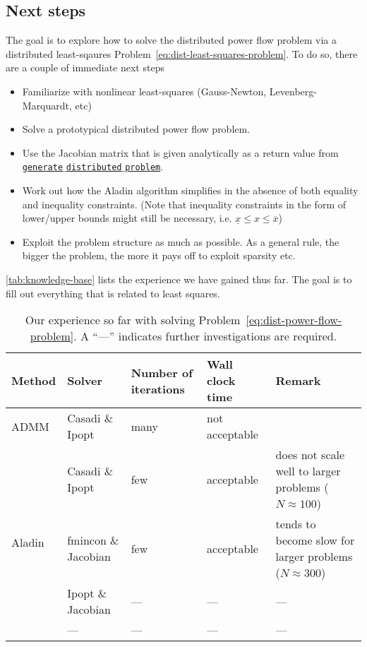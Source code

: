 \documentclass{article}
\begin{document}
\subsection{Next steps}

The goal is to explore how to solve the distributed power flow problem via a distributed least-sqaures Problem~\ref{eq:dist-least-squares-problem}.
To do so, there are a couple of immediate next steps
\begin{itemize}
    \item Familiarize with nonlinear least-squares (Gauss-Newton, Levenberg-Marquardt, etc)
    \item Solve a prototypical distributed power flow problem.
    \item Use the Jacobian matrix that is given analytically as a return value from \href{https://iai-vcs.iai.kit.edu/advancedcontrol/code/morenet/morenet/-/blob/master/03_parser/generate_distributed_problem.m}{\texttt{generate$\_$distributed$\_$problem}}.
    \item Work out how the Aladin algorithm simplifies in the absence of both equality and inequality constraints. (Note that inequality constraints in the form of lower/upper bounds might still be necessary, i.e. $\underline{x} \leq x \leq \overline{x}$)
    \item Exploit the problem structure as much as possible. As a general rule, the bigger the problem, the more it pays off to exploit sparsity etc.
\end{itemize}
\autoref{tab:knowledge-base} lists the experience we have gained thus far.
The goal is to fill out everything that is related to least squares.

\begin{table}
    \centering
    \caption{Our experience so far with solving Problem~\ref{eq:dist-power-flow-problem}. A ``---'' indicates further investigations are required.\label{tab:knowledge-base}}
    \begin{tabular}{llllp{4cm}}
        \toprule
        Method & Solver & Number of iterations & Wall clock time & Remark\\
        \midrule
        ADMM & Casadi \& Ipopt & many & not acceptable\\
        \midrule
        \multirow{5}{*}{Aladin} & Casadi \& Ipopt & few & acceptable & does not scale well to larger problems ($N \approx 100$)\\
         & fmincon \& Jacobian & few & acceptable & tends to become slow for larger problems ($N \approx 300$)\\
         & Ipopt \& Jacobian & --- & --- & ---\\
         \midrule
        Least squares & --- & --- & --- & ---\\
        \bottomrule
    \end{tabular}
\end{table}
\end{document}

